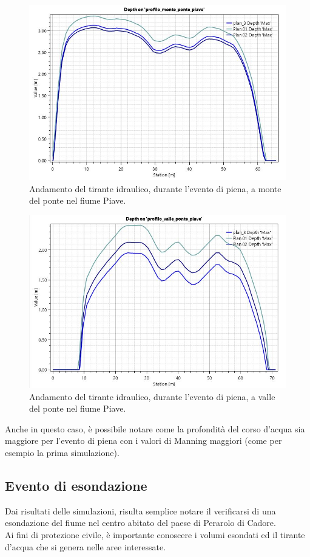 \begin{figure}[htb] \centering
    \includegraphics[scale=0.5]{immagini/depth_monte_ponte_piave.JPG}
    \caption{Andamento del tirante idraulico, durante l'evento di piena, a monte del ponte nel fiume Piave.}
    \label{figure:depth_monte_ponte_piave}
\end{figure}

\begin{figure}[htb] \centering
    \includegraphics[scale=0.5]{immagini/depth_valle_ponte_piave.JPG}
    \caption{Andamento del tirante idraulico, durante l'evento di piena, a valle del ponte nel fiume Piave.}
    \label{figure:depth_valle_ponte_piave}
\end{figure}

Anche in questo caso, è possibile notare come la profondità del corso d'acqua sia maggiore per l'evento di piena con i valori di Manning maggiori (come per esempio la prima simulazione).

\subsection{Evento di esondazione}
Dai risultati delle simulazioni, risulta semplice notare il verificarsi di una esondazione del fiume nel centro abitato del paese di Perarolo di Cadore.\\
Ai fini di protezione civile, è importante conoscere i volumi esondati ed il tirante d'acqua che si genera nelle aree interessate.
